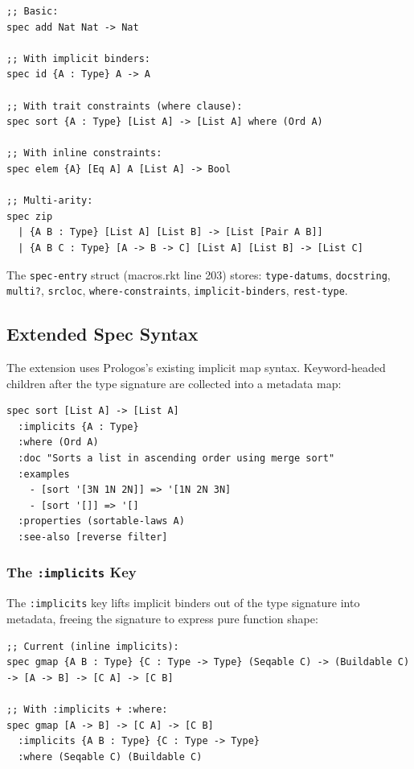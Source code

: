 \documentclass[11pt]{article}
\begin{document}
\begin{verbatim}
;; Basic:
spec add Nat Nat -> Nat

;; With implicit binders:
spec id {A : Type} A -> A

;; With trait constraints (where clause):
spec sort {A : Type} [List A] -> [List A] where (Ord A)

;; With inline constraints:
spec elem {A} [Eq A] A [List A] -> Bool

;; Multi-arity:
spec zip
  | {A B : Type} [List A] [List B] -> [List [Pair A B]]
  | {A B C : Type} [A -> B -> C] [List A] [List B] -> [List C]
\end{verbatim}

The \texttt{spec-entry} struct (macros.rkt line 203) stores: \texttt{type-datums},
\texttt{docstring}, \texttt{multi?}, \texttt{srcloc}, \texttt{where-constraints}, \texttt{implicit-binders},
\texttt{rest-type}.
\subsection{Extended Spec Syntax}
\label{sec:orga45539c}

The extension uses Prologos's existing implicit map syntax. Keyword-headed
children after the type signature are collected into a metadata map:

\begin{verbatim}
spec sort [List A] -> [List A]
  :implicits {A : Type}
  :where (Ord A)
  :doc "Sorts a list in ascending order using merge sort"
  :examples
    - [sort '[3N 1N 2N]] => '[1N 2N 3N]
    - [sort '[]] => '[]
  :properties (sortable-laws A)
  :see-also [reverse filter]
\end{verbatim}
\subsubsection{The \texttt{:implicits} Key}
\label{sec:orge7189f4}

The \texttt{:implicits} key lifts implicit binders out of the type signature into
metadata, freeing the signature to express pure function shape:

\begin{verbatim}
;; Current (inline implicits):
spec gmap {A B : Type} {C : Type -> Type} (Seqable C) -> (Buildable C) -> [A -> B] -> [C A] -> [C B]

;; With :implicits + :where:
spec gmap [A -> B] -> [C A] -> [C B]
  :implicits {A B : Type} {C : Type -> Type}
  :where (Seqable C) (Buildable C)
\end{verbatim}
\end{document}
